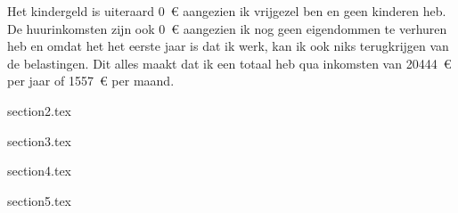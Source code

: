 Het kindergeld is uiteraard 0~\euro{} aangezien ik vrijgezel ben en geen kinderen heb. De huurinkomsten zijn ook 0~\euro{} aangezien ik nog geen eigendommen te verhuren heb en omdat het het eerste jaar is dat ik werk, kan ik ook niks terugkrijgen van de belastingen.
Dit alles maakt dat ik een totaal heb qua inkomsten van 20444~\euro{} per jaar of 1557~\euro{} per maand.



{section2.tex}


{section3.tex}



{section4.tex}



{section5.tex}


\printbibliography[segment=\therefsegment,heading=subbibliography]


